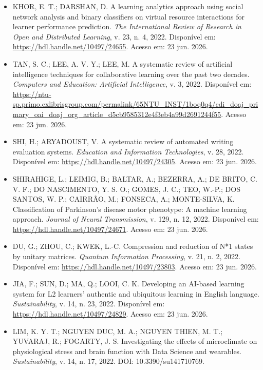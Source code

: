\documentclass[english]{textolivre}
\begin{document}
\begin{itemize}
\item[] KHOR, E. T.; DARSHAN, D. A learning analytics approach using social network analysis and binary classifiers on virtual resource interactions for learner performance prediction. \textit{The International Review of Research in Open and Distributed Learning}, v. 23, n. 4, 2022. Disponível em: \url{https://hdl.handle.net/10497/24655}. Acesso em: 23 jun. 2026.

\item[] TAN, S. C.; LEE, A. V. Y.; LEE, M. A systematic review of artificial intelligence techniques for collaborative learning over the past two decades. \textit{Computers and Education: Artificial Intelligence}, v. 3, 2022. Disponível em: \url{https://ntu-sp.primo.exlibrisgroup.com/permalink/65NTU_INST/1boq0q4/cdi_doaj_primary_oai_doaj_org_article_d5cb9585312e4f3eb4a99d2691244f55}. Acesso em: 23 jun. 2026.

\item[] SHI, H.; ARYADOUST, V. A systematic review of automated writing evaluation systems. \textit{Education and Information Technologies}, v. 28, 2022. Disponível em: \url{https://hdl.handle.net/10497/24305}. Acesso em: 23 jun. 2026.

\item[] SHIRAHIGE, L.; LEIMIG, B.; BALTAR, A.; BEZERRA, A.; DE BRITO, C. V. F.; DO NASCIMENTO, Y. S. O.; GOMES, J. C.; TEO, W.-P.; DOS SANTOS, W. P.; CAIRRÃO, M.; FONSECA, A.; MONTE-SILVA, K. Classification of Parkinson’s disease motor phenotype: A machine learning approach. \textit{Journal of Neural Transmission}, v. 129, n. 12, 2022. Disponível em: \url{https://hdl.handle.net/10497/24671}. Acesso em: 23 jun. 2026.

\item[] DU, G.; ZHOU, C.; KWEK, L.-C. Compression and reduction of N*1 states by unitary matrices. \textit{Quantum Information Processing}, v. 21, n. 2, 2022. Disponível em: \url{https://hdl.handle.net/10497/23803}. Acesso em: 23 jun. 2026.

\item[] JIA, F.; SUN, D.; MA, Q.; LOOI, C. K. Developing an AI-based learning system for L2 learners’ authentic and ubiquitous learning in English language. \textit{Sustainability}, v. 14, n. 23, 2022. Disponível em: \url{https://hdl.handle.net/10497/24829}. Acesso em: 23 jun. 2026.

\item[] LIM, K. Y. T.; NGUYEN DUC, M. A.; NGUYEN THIEN, M. T.; YUVARAJ, R.; FOGARTY, J. S. Investigating the effects of microclimate on physiological stress and brain function with Data Science and wearables. \textit{Sustainability}, v. 14, n. 17, 2022. DOI: 10.3390/su141710769.


\end{itemize}
\end{document}
